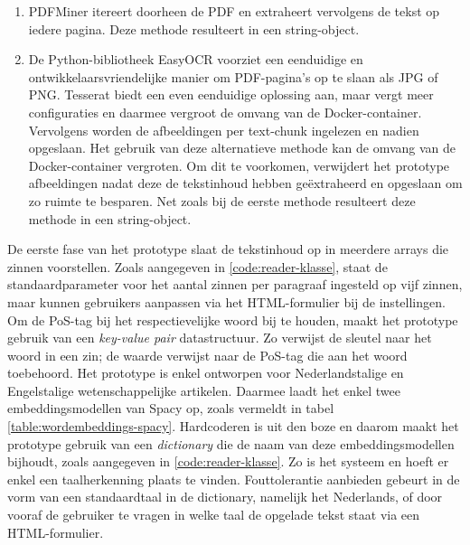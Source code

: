\begin{enumerate}
	\item PDFMiner itereert doorheen de PDF en extraheert vervolgens de tekst op iedere pagina. Deze methode resulteert in een string-object.
	\item De Python-bibliotheek EasyOCR voorziet een eenduidige en ontwikkelaarsvriendelijke manier om PDF-pagina's op te slaan als JPG of PNG. Tesserat biedt een even eenduidige oplossing aan, maar vergt meer configuraties en daarmee vergroot de omvang van de Docker-container. Vervolgens worden de afbeeldingen per text-chunk ingelezen en nadien opgeslaan. Het gebruik van deze alternatieve methode kan de omvang van de Docker-container vergroten. Om dit te voorkomen, verwijdert het prototype afbeeldingen nadat deze de tekstinhoud hebben geëxtraheerd en opgeslaan om zo ruimte te besparen. Net zoals bij de eerste methode resulteert deze methode in een string-object.
\end{enumerate}

De eerste fase van het prototype slaat de tekstinhoud op in meerdere arrays die zinnen voorstellen. Zoals aangegeven in \ref{code:reader-klasse}, staat de standaardparameter voor het aantal zinnen per paragraaf ingesteld op vijf zinnen, maar kunnen gebruikers aanpassen via het HTML-formulier bij de instellingen. Om de PoS-tag bij het respectievelijke woord bij te houden, maakt het prototype gebruik van een \textit{key-value pair} datastructuur. Zo verwijst de sleutel naar het woord in een zin; de waarde verwijst naar de PoS-tag die aan het woord toebehoord. Het prototype is enkel ontworpen voor Nederlandstalige en Engelstalige wetenschappelijke artikelen. Daarmee laadt het enkel twee embeddingsmodellen van Spacy op, zoals vermeldt in tabel \ref{table:wordembeddings-spacy}. Hardcoderen is uit den boze en daarom maakt het prototype gebruik van een \textit{dictionary} die de naam van deze embeddingsmodellen bijhoudt, zoals aangegeven in \ref{code:reader-klasse}. Zo is het systeem en hoeft er enkel een taalherkenning plaats te vinden. Fouttolerantie aanbieden gebeurt in de vorm van een standaardtaal in de dictionary, namelijk het Nederlands, of door vooraf de gebruiker te vragen in welke taal de opgelade tekst staat via een HTML-formulier.



